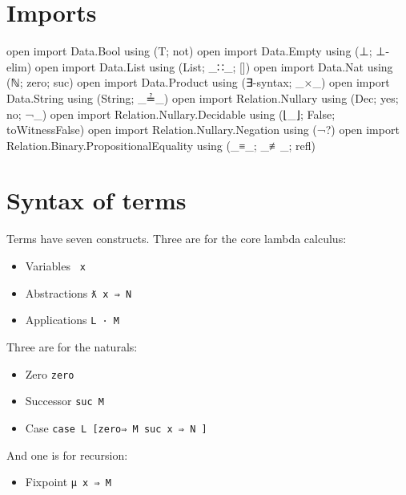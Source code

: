 \hypertarget{imports}{%
\section{Imports}\label{imports}}

\begin{fence}
\begin{code}
open import Data.Bool using (T; not)
open import Data.Empty using (⊥; ⊥-elim)
open import Data.List using (List; _∷_; [])
open import Data.Nat using (ℕ; zero; suc)
open import Data.Product using (∃-syntax; _×_)
open import Data.String using (String; _≟_)
open import Relation.Nullary using (Dec; yes; no; ¬_)
open import Relation.Nullary.Decidable using (⌊_⌋; False; toWitnessFalse)
open import Relation.Nullary.Negation using (¬?)
open import Relation.Binary.PropositionalEquality using (_≡_; _≢_; refl)
\end{code}
\end{fence}

\hypertarget{syntax-of-terms}{%
\section{Syntax of terms}\label{syntax-of-terms}}

Terms have seven constructs. Three are for the core lambda calculus:

\begin{itemize}
\tightlist
\item
  Variables \texttt{\textasciigrave{}\ x}
\item
  Abstractions \texttt{ƛ\ x\ ⇒\ N}
\item
  Applications \texttt{L\ ·\ M}
\end{itemize}

Three are for the naturals:

\begin{itemize}
\tightlist
\item
  Zero \texttt{\textasciigrave{}zero}
\item
  Successor \texttt{\textasciigrave{}suc\ M}
\item
  Case \texttt{case\ L\ {[}zero⇒\ M\ \textbar{}suc\ x\ ⇒\ N\ {]}}
\end{itemize}

And one is for recursion:

\begin{itemize}
\tightlist
\item
  Fixpoint \texttt{μ\ x\ ⇒\ M}
\end{itemize}

